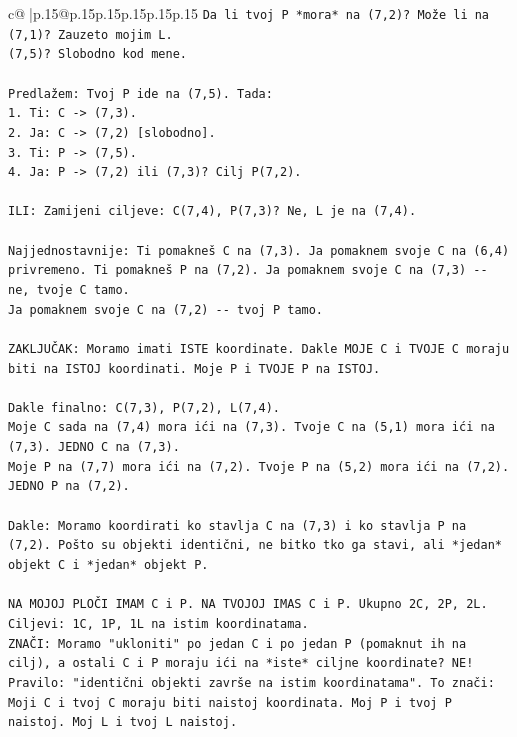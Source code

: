 \documentclass{article}
\begin{document}
{\begin{supertabular}{c@{$\;$}|p{.15\linewidth}@{}p{.15\linewidth}p{.15\linewidth}p{.15\linewidth}p{.15\linewidth}p{.15\linewidth}}
{{{\texttt{Da li tvoj P *mora* na (7,2)? Može li na (7,1)? Zauzeto mojim L.} \\
\texttt{(7,5)? Slobodno kod mene.} \\
\\ 
\texttt{Predlažem: Tvoj P ide na (7,5). Tada:} \\
\texttt{1. Ti: C {-}> (7,3).} \\
\texttt{2. Ja: C {-}> (7,2) {[}slobodno{]}.} \\
\texttt{3. Ti: P {-}> (7,5).} \\
\texttt{4. Ja: P {-}> (7,2) ili (7,3)? Cilj P(7,2).} \\
\\ 
\texttt{ILI: Zamijeni ciljeve: C(7,4), P(7,3)? Ne, L je na (7,4).} \\
\\ 
\texttt{Najjednostavnije: Ti pomakneš C na (7,3). Ja pomaknem svoje C na (6,4) privremeno. Ti pomakneš P na (7,2). Ja pomaknem svoje C na (7,3) {-}{-} ne, tvoje C tamo.} \\
\texttt{Ja pomaknem svoje C na (7,2) {-}{-} tvoj P tamo.} \\
\\ 
\texttt{ZAKLJUČAK: Moramo imati ISTE koordinate. Dakle MOJE C i TVOJE C moraju biti na ISTOJ koordinati. Moje P i TVOJE P na ISTOJ.} \\
\\ 
\texttt{Dakle finalno: C(7,3), P(7,2), L(7,4).} \\
\texttt{Moje C sada na (7,4) mora ići na (7,3). Tvoje C na (5,1) mora ići na (7,3). JEDNO C na (7,3).} \\
\texttt{Moje P na (7,7) mora ići na (7,2). Tvoje P na (5,2) mora ići na (7,2). JEDNO P na (7,2).} \\
\\ 
\texttt{Dakle: Moramo koordirati ko stavlja C na (7,3) i ko stavlja P na (7,2). Pošto su objekti identični, ne bitko tko ga stavi, ali *jedan* objekt C i *jedan* objekt P.} \\
\\ 
\texttt{NA MOJOJ PLOČI IMAM C i P. NA TVOJOJ IMAS C i P. Ukupno 2C, 2P, 2L. Ciljevi: 1C, 1P, 1L na istim koordinatama.} \\
\texttt{ZNAČI: Moramo "ukloniti" po jedan C i po jedan P (pomaknut ih na cilj), a ostali C i P moraju ići na *iste* ciljne koordinate? NE! Pravilo: "identični objekti završe na istim koordinatama". To znači: Moji C i tvoj C moraju biti naistoj koordinata. Moj P i tvoj P naistoj. Moj L i tvoj L naistoj.} \\
}}}
\end{supertabular}}
\end{document}
